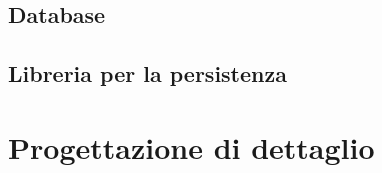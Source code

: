 \documentclass[10pt, a4paper]{article}
\begin{document}
\subsection{Database} %

\subsection{Libreria per la persistenza} %

\newpage

\section{Progettazione di dettaglio}
\end{document}
